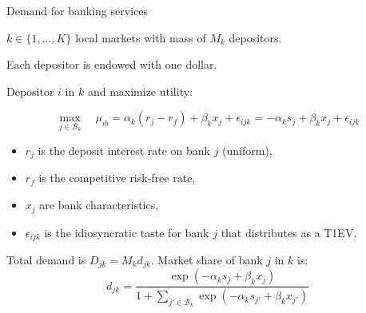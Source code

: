 \documentclass[notes,10pt, aspectratio=169]{beamer}
\newenvironment{wideitemize}{\itemize\addtolength{\itemsep}{10pt}}{\enditemize}
\begin{document}
\begin{frame}{ Demand for banking services}

    \begin{wideitemize}

        \item $k \in \{1, ..., K\}$ local markets with mass of $M_k$ depositors.
        
        \item Each depositor is endowed with one dollar.

        \item Depositor $i$ in $k$ and maximize utility:
        
        \begin{equation}
        \max _{j \in \mathcal{B}_k} \quad \mu_{i b}=\alpha_{k} (r_j - r_f) + \beta_k x_j + \epsilon_{ijk} = - \alpha_{k} s_j + \beta_k x_j + \epsilon_{ijk}
        \end{equation}

        \begin{itemize}
            \item $r_j$ is the deposit interest rate on bank $j$ (uniform), 
            \item $r_f$ is the competitive risk-free rate,
            \item $x_j$ are bank characteristics,
            \item $\epsilon_{ijk}$ is the idiosyncratic taste for bank $j$ that distributes as a T1EV.
        \end{itemize}

        \item Total demand is $D_{jk} = M_k d_{jk}$.
 Market share of bank $j$ in $k$ is: 
        $$ 
 d_{jk} = \frac{\exp (-\alpha_k s_j + \beta_k x_j)}{1 + \sum_{j' \in \mathcal{B}_k} \exp (-\alpha_k s_{j'} + \beta_k x_{j'})}
        $$
    \end{wideitemize}


    \end{frame}
\end{document}
